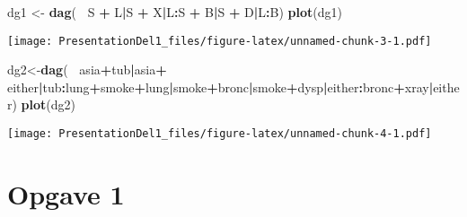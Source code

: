 \documentclass[
]{article}
\newenvironment{Shaded}{\begin{snugshade}}{\end{snugshade}}
\newcommand{\KeywordTok}[1]{\textcolor[rgb]{0.13,0.29,0.53}{\textbf{#1}}}
\newcommand{\NormalTok}[1]{#1}
\newcommand{\OperatorTok}[1]{\textcolor[rgb]{0.81,0.36,0.00}{\textbf{#1}}}
\newcommand{\StringTok}[1]{\textcolor[rgb]{0.31,0.60,0.02}{#1}}
\begin{document}
\begin{Shaded}
\begin{Highlighting}[]
\NormalTok{dg1 <-}\StringTok{ }\KeywordTok{dag}\NormalTok{(}\OperatorTok{~}\StringTok{ }\NormalTok{S }\OperatorTok{+}\StringTok{ }\NormalTok{L}\OperatorTok{|}\NormalTok{S }\OperatorTok{+}\StringTok{ }\NormalTok{X}\OperatorTok{|}\NormalTok{L}\OperatorTok{:}\NormalTok{S }\OperatorTok{+}\StringTok{ }\NormalTok{B}\OperatorTok{|}\NormalTok{S }\OperatorTok{+}\StringTok{ }\NormalTok{D}\OperatorTok{|}\NormalTok{L}\OperatorTok{:}\NormalTok{B)}
\KeywordTok{plot}\NormalTok{(dg1)}
\end{Highlighting}
\end{Shaded}

\texttt{[image: PresentationDel1\_files/figure-latex/unnamed-chunk-3-1.pdf]}

\begin{Shaded}
\begin{Highlighting}[]
\NormalTok{dg2<-}\KeywordTok{dag}\NormalTok{(}\OperatorTok{~}\StringTok{ }\NormalTok{asia}\OperatorTok{+}\NormalTok{tub}\OperatorTok{|}\NormalTok{asia}\OperatorTok{+}\StringTok{ }\NormalTok{either}\OperatorTok{|}\NormalTok{tub}\OperatorTok{:}\NormalTok{lung}\OperatorTok{+}\NormalTok{smoke}\OperatorTok{+}\NormalTok{lung}\OperatorTok{|}\NormalTok{smoke}\OperatorTok{+}\NormalTok{bronc}\OperatorTok{|}\NormalTok{smoke}\OperatorTok{+}\NormalTok{dysp}\OperatorTok{|}\NormalTok{either}\OperatorTok{:}\NormalTok{bronc}\OperatorTok{+}\NormalTok{xray}\OperatorTok{|}\NormalTok{either)}
\KeywordTok{plot}\NormalTok{(dg2)}
\end{Highlighting}
\end{Shaded}

\texttt{[image: PresentationDel1\_files/figure-latex/unnamed-chunk-4-1.pdf]}

\hypertarget{opgave-1}{%
\section{Opgave 1}\label{opgave-1}}
\end{document}
